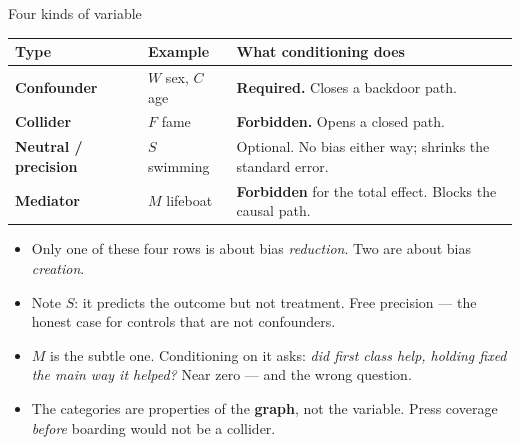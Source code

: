 \documentclass[
  11pt,
  ignorenonframetext,
  aspectratio=169,
]{beamer}
\providecommand{\tightlist}{%
  \setlength{\itemsep}{0pt}\setlength{\parskip}{0pt}}
\begin{document}
\begin{frame}{Four kinds of variable}
\protect{}\label{four-kinds-of-variable}
\begin{center}
\begin{tabular}{llp{6.5cm}}
\toprule
Type & Example & What conditioning does \\
\midrule
\textbf{Confounder}       & $W$ sex, $C$ age & \textbf{Required.} Closes a backdoor path. \\
\textbf{Collider}         & $F$ fame         & \textbf{Forbidden.} Opens a closed path. \\
\textbf{Neutral / precision} & $S$ swimming  & Optional. No bias either way; shrinks the standard error. \\
\textbf{Mediator}         & $M$ lifeboat    & \textbf{Forbidden} for the total effect. Blocks the causal path. \\
\bottomrule
\end{tabular}
\end{center}

\vspace{0.4em}

\begin{itemize}
\tightlist
\item
  Only one of these four rows is about bias \emph{reduction}. Two are
  about bias \emph{creation}.
\item
  Note \(S\): it predicts the outcome but not treatment. Free precision
  --- the honest case for controls that are not confounders.
\item
  \(M\) is the subtle one. Conditioning on it asks: \emph{did first
  class help, holding fixed the main way it helped?} Near zero --- and
  the wrong question.
\item
  The categories are properties of the \textbf{graph}, not the variable.
  Press coverage \emph{before} boarding would not be a collider.
\end{itemize}
\end{frame}
\end{document}
